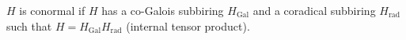 $H$ is conormal if $H$ has a co-Galois subbiring $H_{\text{Gal}}$ and a coradical subbiring $H_{\text{rad}}$ such that $H = H_{\text{Gal}} H_{\text{rad}}$ (internal tensor product).
